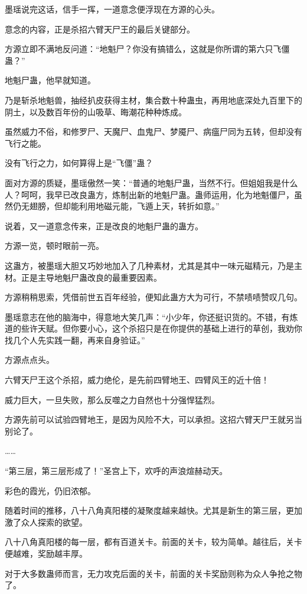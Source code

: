 \begin{this_body}
墨瑶说完这话，信手一挥，一道意念便浮现在方源的心头。

意念的内容，正是杀招六臂天尸王的最后关键部分。

方源立即不满地反问道：“地魁尸？你没有搞错么，这就是你所谓的第六只飞僵蛊？”

地魁尸蛊，他早就知道。

乃是斩杀地魁兽，抽经扒皮获得主材，集合数十种蛊虫，再用地底深处九百里下的阴土，以及数百年份的山吸草、晦潮花种种炼成。

虽然威力不俗，和修罗尸、天魔尸、血鬼尸、梦魇尸、病瘟尸同为五转，但却没有飞行之能。

没有飞行之力，如何算得上是“飞僵”蛊？

面对方源的质疑，墨瑶傲然一笑：“普通的地魁尸蛊，当然不行。但姐姐我是什么人？呵呵，我早已改良蛊方，炼制出新的地魁尸蛊。蛊师运用，化为地魁僵尸，虽然仍无翅膀，但却能利用地磁元能，飞遁上天，转折如意。”

说着，又一道意念传来，正是改良的地魁尸蛊的蛊方。

方源一览，顿时眼前一亮。

这蛊方，被墨瑶大胆又巧妙地加入了几种素材，尤其是其中一味元磁精元，乃是主材。正是主导地魁尸蛊改良的最重要因素。

方源稍稍思索，凭借前世五百年经验，便知此蛊方大为可行，不禁啧啧赞叹几句。

墨瑶意志在他的脑海中，得意地大笑几声：“小少年，你还挺识货的。不错，有炼道的些许天赋。但你要小心，这个杀招只是在你提供的基础上进行的草创，我劝你找几个人先实践一翻，再来自身验证。”

方源点点头。

六臂天尸王这个杀招，威力绝伦，是先前四臂地王、四臂风王的近十倍！

威力巨大，一旦失败，那么反噬之力自然也十分强悍猛烈。

方源先前可以试验四臂地王，是因为风险不大，可以承担。这招六臂天尸王就另当别论了。

……

“第三层，第三层形成了！”圣宫上下，欢呼的声浪煊赫动天。

彩色的霞光，仍旧浓郁。

随着时间的推移，八十八角真阳楼的凝聚度越来越快。尤其是新生的第三层，更加激了众人探索的欲望。

八十八角真阳楼的每一层，都有百道关卡。前面的关卡，较为简单。越往后，关卡便越难，奖励越丰厚。

对于大多数蛊师而言，无力攻克后面的关卡，前面的关卡奖励则称为众人争抢之物了。


\end{this_body}
